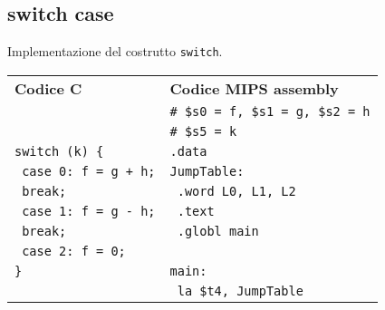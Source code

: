 \documentclass[../main.tex]{subfiles}
\begin{document}
\subsection{switch case}
Implementazione del costrutto \texttt{switch}. \\[3.5mm]
\noindent
\begin{tabular}{ p{8cm} p{8cm} }
    \textbf{Codice C} & \textbf{Codice MIPS assembly} \\
    & \texttt{\# \$s0 = f, \$s1 = g, \$s2 = h} \\
    & \texttt{\# \$s5 = k} \\
    \texttt{switch (k) \{} & \texttt{.data} \\
    \texttt{ \hspace*{0cm} \hspace*{0cm} \hspace*{0cm} case 0: f = g + h;} & \texttt{JumpTable:} \\
    \texttt{ \hspace*{0cm} \hspace*{0cm} \hspace*{0cm} break;} & \texttt{ \hspace*{0cm} \hspace*{0cm} .word L0, L1, L2} \\
    \texttt{ \hspace*{0cm} \hspace*{0cm} \hspace*{0cm} case 1: f = g - h;} & \texttt{ \hspace*{0cm} \hspace*{0cm} .text} \\
    \texttt{ \hspace*{0cm} \hspace*{0cm} \hspace*{0cm} break;} & \texttt{ \hspace*{0cm} \hspace*{0cm} .globl main} \\
    \texttt{ \hspace*{0cm} \hspace*{0cm} \hspace*{0cm} case 2: f = 0;} \\
    \texttt{\}} & \texttt{main:} \\
    & \texttt{ \hspace*{0cm} \hspace*{0cm} \hspace*{0cm} \hspace*{0cm} la \$t4, JumpTable} \\

\end{tabular}
\end{document}
